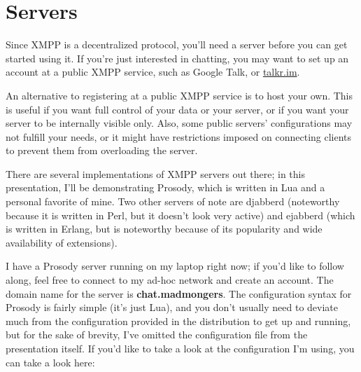 \section{Servers}

\pause

Since XMPP is a decentralized protocol, you'll need a server before you can get started using it.
If you're just interested in chatting, you may want to set up an account at a public XMPP service,
such as Google Talk, or \url{talkr.im}.

\pause
An alternative to registering at a public XMPP service is to host your own.  This is useful if you want
full control of your data or your server, or if you want your server to be internally visible only.  Also,
some public servers' configurations may not fulfill your needs, or it might have restrictions imposed on
connecting clients to prevent them from overloading the server.

\pause
There are several implementations of XMPP servers out there; in this presentation, I'll be demonstrating Prosody,
which is written in Lua and a personal favorite of mine.  Two other servers of note are djabberd (noteworthy
because it is written in Perl, but it doesn't look very active) and ejabberd (which is written in Erlang, but is
noteworthy because of its popularity and wide availability of extensions).

\pause
I have a Prosody server running on my laptop right now; if you'd like to follow along, feel free to connect to my ad-hoc
network and create an account.  The domain name for the server is \textbf{chat.madmongers}.  The configuration syntax for Prosody is
fairly simple (it's just Lua), and you don't usually need to deviate much from the configuration provided in the distribution to
get up and running, but for the sake of brevity, I've omitted the configuration file from the presentation itself.  If you'd
like to take a look at the configuration I'm using, you can take a look here:

\pause
{}
